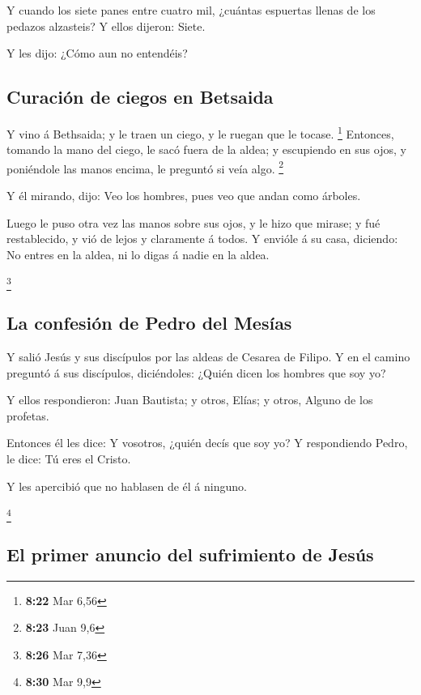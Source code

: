  Y cuando los siete panes entre cuatro mil, ¿cuántas
espuertas llenas de los pedazos alzasteis? Y ellos dijeron: Siete.

 Y les dijo: ¿Cómo aun no entendéis?

\hypertarget{curaciuxf3n-de-ciegos-en-betsaida}{%
\subsection{Curación de ciegos en
Betsaida}\label{curaciuxf3n-de-ciegos-en-betsaida}}

 Y vino á Bethsaida; y le traen un ciego, y le ruegan que
le tocase. \footnote{\textbf{8:22} Mar 6,56}  Entonces,
tomando la mano del ciego, le sacó fuera de la aldea; y escupiendo en
sus ojos, y poniéndole las manos encima, le preguntó si veía algo.
\footnote{\textbf{8:23} Juan 9,6}

 Y él mirando, dijo: Veo los hombres, pues veo que andan
como árboles.

 Luego le puso otra vez las manos sobre sus ojos, y le hizo
que mirase; y fué restablecido, y vió de lejos y claramente á todos.
 Y envióle á su casa, diciendo: No entres en la aldea, ni
lo digas á nadie en la aldea.

\footnote{\textbf{8:26} Mar 7,36}

\hypertarget{la-confesiuxf3n-de-pedro-del-mesuxedas}{%
\subsection{La confesión de Pedro del
Mesías}\label{la-confesiuxf3n-de-pedro-del-mesuxedas}}

 Y salió Jesús y sus discípulos por las aldeas de Cesarea
de Filipo. Y en el camino preguntó á sus discípulos, diciéndoles: ¿Quién
dicen los hombres que soy yo?

 Y ellos respondieron: Juan Bautista; y otros, Elías; y
otros, Alguno de los profetas.

 Entonces él les dice: Y vosotros, ¿quién decís que soy yo?
Y respondiendo Pedro, le dice: Tú eres el Cristo.

 Y les apercibió que no hablasen de él á ninguno.

\footnote{\textbf{8:30} Mar 9,9}

\hypertarget{el-primer-anuncio-del-sufrimiento-de-jesuxfas}{%
\subsection{El primer anuncio del sufrimiento de
Jesús}\label{el-primer-anuncio-del-sufrimiento-de-jesuxfas}}

